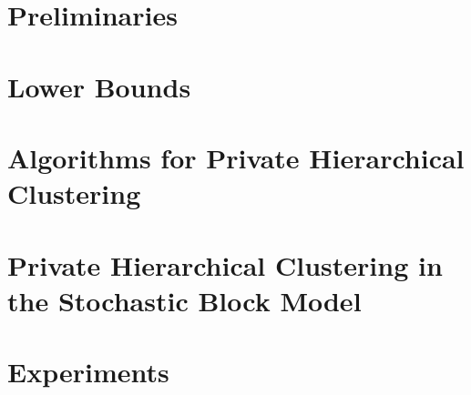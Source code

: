 \documentclass{article}
\begin{document}
\section{Preliminaries}\label{chap5-sec:preliminaries}


\section{Lower Bounds}\label{chap5-sec:lower-bounds}


\section{Algorithms for Private Hierarchical Clustering}\label{chap5-sec:algorithms}


\section{Private Hierarchical Clustering in the Stochastic Block Model}\label{chap5-sec:algorithms-hsbm}


\section{Experiments} \label{chap5-sec:experiments}




\appendix
\onecolumn

\end{document}
